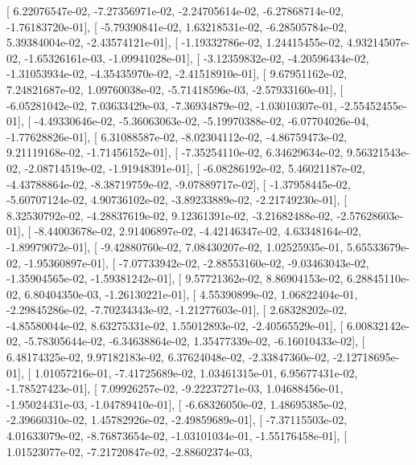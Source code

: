 \documentclass{article}
\begin{document}
       [  6.22076547e-02,  -7.27356971e-02,  -2.24705614e-02,
         -6.27868714e-02,  -1.76183720e-01],
       [ -5.79390841e-02,   1.63218531e-02,  -6.28505784e-02,
          5.39384004e-02,  -2.43574121e-01],
       [ -1.19332786e-02,   1.24415455e-02,   4.93214507e-02,
         -1.65326161e-03,  -1.09941028e-01],
       [ -3.12359832e-02,  -4.20596434e-02,  -1.31053934e-02,
         -4.35435970e-02,  -2.41518910e-01],
       [  9.67951162e-02,   7.24821687e-02,   1.09760038e-02,
         -5.71418596e-03,  -2.57933160e-01],
       [ -6.05281042e-02,   7.03633429e-03,  -7.36934879e-02,
         -1.03010307e-01,  -2.55452455e-01],
       [ -4.49330646e-02,  -5.36063063e-02,  -5.19970388e-02,
         -6.07704026e-04,  -1.77628826e-01],
       [  6.31088587e-02,  -8.02304112e-02,  -4.86759473e-02,
          9.21119168e-02,  -1.71456152e-01],
       [ -7.35254110e-02,   6.34629634e-02,   9.56321543e-02,
         -2.08714519e-02,  -1.91948391e-01],
       [ -6.08286192e-02,   5.46021187e-02,  -4.43788864e-02,
         -8.38719759e-02,  -9.07889717e-02],
       [ -1.37958445e-02,  -5.60707124e-02,   4.90736102e-02,
         -3.89233889e-02,  -2.21749230e-01],
       [  8.32530792e-02,  -4.28837619e-02,   9.12361391e-02,
         -3.21682488e-02,  -2.57628603e-01],
       [ -8.44003678e-02,   2.91406897e-02,  -4.42146347e-02,
          4.63348164e-02,  -1.89979072e-01],
       [ -9.42880760e-02,   7.08430207e-02,   1.02525935e-01,
          5.65533679e-02,  -1.95360897e-01],
       [ -7.07733942e-02,  -2.88553160e-02,  -9.03463043e-02,
         -1.35904565e-02,  -1.59381242e-01],
       [  9.57721362e-02,   8.86904153e-02,   6.28845110e-02,
          6.80404350e-03,  -1.26130221e-01],
       [  4.55390899e-02,   1.06822404e-01,  -2.29845286e-02,
         -7.70234343e-02,  -1.21277603e-01],
       [  2.68328202e-02,  -4.85580044e-02,   8.63275331e-02,
          1.55012893e-02,  -2.40565529e-01],
       [  6.00832142e-02,  -5.78305644e-02,  -6.34638864e-02,
          1.35477339e-02,  -6.16010433e-02],
       [  6.48174325e-02,   9.97182183e-02,   6.37624048e-02,
         -2.33847360e-02,  -2.12718695e-01],
       [  1.01057216e-01,  -7.41725689e-02,   1.03461315e-01,
          6.95677431e-02,  -1.78527423e-01],
       [  7.09926257e-02,  -9.22237271e-03,   1.04688456e-01,
         -1.95024431e-03,  -1.04789410e-01],
       [ -6.68326050e-02,   1.48695385e-02,  -2.39660310e-02,
          1.45782926e-02,  -2.49859689e-01],
       [ -7.37115503e-02,   4.01633079e-02,  -8.76873654e-02,
         -1.03101034e-01,  -1.55176458e-01],
       [  1.01523077e-02,  -7.21720847e-02,  -2.88602374e-03,
\end{document}
